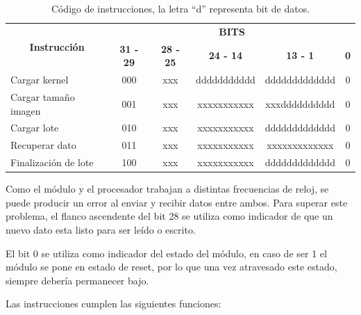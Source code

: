 \begin{table}
\renewcommand{\arraystretch}{1.3}
\caption{Código de instrucciones, la letra ``d'' representa bit de datos.}\label{instr}
\centering
\begin{tabular}{|l|c|c|c|c|c|}
  \hline
  \multicolumn{1}{|c|}{\multirow{2}{*}{\textbf{Instrucción}}} & \multicolumn{5}{c|}{\textbf{BITS}} \\ \cline{2-6}
                                        & \textbf{31 - 29} & \textbf{28 - 25} & \textbf{24 - 14} & \textbf{13 - 1} & \textbf{0}\\\hline
  Cargar kernel                         & 000              & xxx              & ddddddddddd      & ddddddddddddd   & 0         \\\hline
  Cargar tamaño imagen                  & 001              & xxx              & xxxxxxxxxxx      & xxxdddddddddd   & 0         \\\hline
  Cargar lote                           & 010              & xxx              & xxxxxxxxxxx      & ddddddddddddd   & 0         \\\hline
  Recuperar dato                        & 011              & xxx              & xxxxxxxxxxx      & xxxxxxxxxxxxx   & 0         \\\hline
  Finalización de lote                  & 100              & xxx              & xxxxxxxxxxx      & ddddddddddddd   & 0         \\\hline
\end{tabular}           
\end{table}

Como el módulo y el procesador trabajan a distintas frecuencias de reloj, se
puede producir un error al enviar y recibir datos entre ambos. Para superar este
problema, el flanco ascendente del bit 28 se utiliza como indicador de que un
nuevo dato esta listo para ser leído o escrito. 

El bit 0 se utiliza como indicador del estado del módulo, en caso de ser 1 el
módulo se pone en estado de reset, por lo que una vez atravesado este estado,
siempre debería permanecer bajo.

Las instrucciones cumplen las siguientes funciones:

